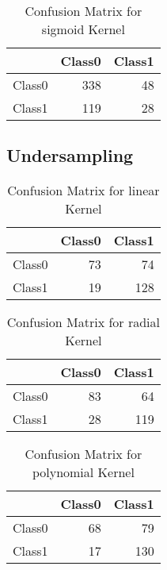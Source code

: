 \begin{table}[H]
\centering
\begin{tabular}{rrr}
  \hline
 & Class0 & Class1 \\ 
  \hline
Class0 & 338 &  48 \\ 
  Class1 & 119 &  28 \\ 
   \hline
\end{tabular}
\caption{Confusion Matrix for sigmoid Kernel} 
\end{table}

\subsection{Undersampling}


\begin{table}[H]
\centering
\begin{tabular}{rrr}
  \hline
 & Class0 & Class1 \\ 
  \hline
Class0 &  73 &  74 \\ 
  Class1 &  19 & 128 \\ 
   \hline
\end{tabular}
\caption{Confusion Matrix for linear Kernel} 
\end{table}

\begin{table}[H]
\centering
\begin{tabular}{rrr}
  \hline
 & Class0 & Class1 \\ 
  \hline
Class0 &  83 &  64 \\ 
  Class1 &  28 & 119 \\ 
   \hline
\end{tabular}
\caption{Confusion Matrix for radial Kernel} 
\end{table}

\begin{table}[H]
\centering
\begin{tabular}{rrr}
  \hline
 & Class0 & Class1 \\ 
  \hline
Class0 &  68 &  79 \\ 
  Class1 &  17 & 130 \\ 
   \hline
\end{tabular}
\caption{Confusion Matrix for polynomial Kernel} 
\end{table}

